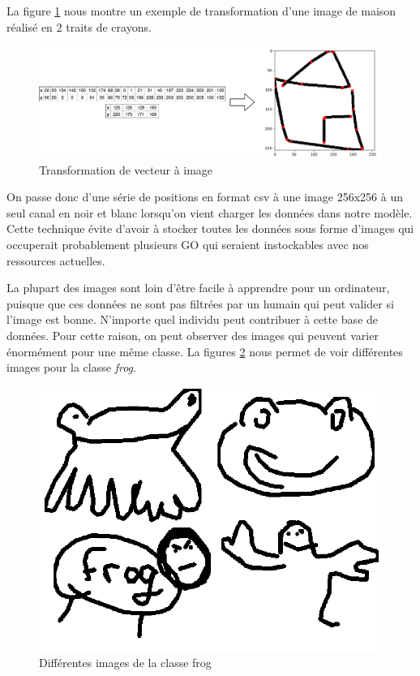 


La figure \ref{transformationimage} nous montre un exemple de transformation d'une image de maison réalisé en 2 traits de crayons. 

\begin{figure}[h]
	\includegraphics[width=\linewidth]{images/Transformations_horizontal.pdf} %
	\caption{Transformation de vecteur à image} %
	\label{transformationimage} 
\end{figure}

On passe donc d'une série de positions en format csv à une image 256x256 à un seul canal en noir et blanc lorsqu'on vient charger les données dans notre modèle. Cette technique évite d'avoir à stocker toutes les données sous forme d'images qui occuperait probablement plusieurs GO qui seraient instockables avec nos ressources actuelles. 




La plupart des images sont loin d'être facile à apprendre pour un ordinateur, puisque que ces données ne sont pas filtrées par un humain qui peut valider si l'image est bonne. N'importe quel individu peut contribuer à cette base de données. Pour cette raison, on peut observer des images qui peuvent varier énormément pour une même classe. La figures \ref{frogs} nous permet de voir différentes images pour la classe \emph{frog}.



\begin{figure}[h]
	\includegraphics[width=\linewidth]{images/Combo_frogs.png} %
	\caption{Différentes images de la classe frog} %
	\label{frogs} 
\end{figure}


